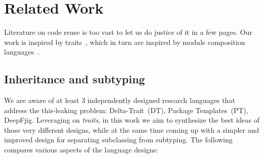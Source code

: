 
\saveSpace\saveSpace
\section{Related Work}
\saveSpace\saveSpace
Literature on code reuse is too vast to let us do justice of it in a few pages.
Our work is inspired by traits~\cite{ducasse2006traits}, which in turn
are inspired by module composition languages~\cite{ancona2002calculus}.
\saveSpace
\subsection{Inheritance and subtyping}
\saveSpace
We are aware of at least 3 independently designed research languages 
that address the this-leaking problem: Delta-Trait~(DT)\cite{Bettini:2010:ISP:1774088.1774530,BETTINI2013521,Bettini2015282}, Package Templates~(PT)\cite{KrogdahlMS09,DBLP:journals/taosd/AxelsenSKM12,DBLP:conf/gpce/AxelsenK12}, DeepFjig\cite{deep,servetto2014meta,fjig}.
Leveraging on \emph{traits}, in this work we aim to synthesize
the best ideas of those very different designs, while at the same time 
coming up with a simpler and improved design for separating
subclassing from subtyping. The following compares 
various aspects of the language designs:

